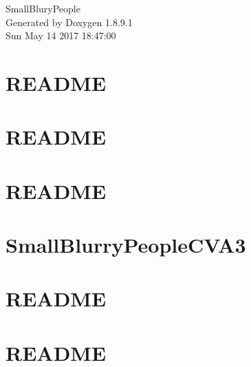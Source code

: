 \documentclass[twoside]{book}
\newcommand{\+}{\discretionary{\mbox{\scriptsize$\hookleftarrow$}}{}{}}
\newcommand{\clearemptydoublepage}{%
  \newpage{\pagestyle{empty}\cleardoublepage}%
}
\begin{document}
\hypersetup{pageanchor=false,
             bookmarks=true,
             bookmarksnumbered=true,
             pdfencoding=unicode
            }
\begin{titlepage}
\vspace*{7cm}
\begin{center}%
{\Large Small\+Blury\+People }\\
\vspace*{1cm}
{\large Generated by Doxygen 1.8.9.1}\\
\vspace*{0.5cm}
{\small Sun May 14 2017 18:47:00}\\
\end{center}
\end{titlepage}
\clearemptydoublepage
\tableofcontents
\clearemptydoublepage
{}
\hypersetup{pageanchor=true}

\chapter{R\+E\+A\+D\+M\+E}
\label{md_geo__r_e_a_d_m_e}
\hypertarget{md_geo__r_e_a_d_m_e}{}

\chapter{R\+E\+A\+D\+M\+E}
\label{md_include__r_e_a_d_m_e}
\hypertarget{md_include__r_e_a_d_m_e}{}

\chapter{R\+E\+A\+D\+M\+E}
\label{md_obj__r_e_a_d_m_e}
\hypertarget{md_obj__r_e_a_d_m_e}{}

\chapter{Small\+Blurry\+People\+C\+V\+A3}
\label{md__r_e_a_d_m_e}
\hypertarget{md__r_e_a_d_m_e}{}

\chapter{R\+E\+A\+D\+M\+E}
\label{md_shaders__r_e_a_d_m_e}
\hypertarget{md_shaders__r_e_a_d_m_e}{}

\chapter{R\+E\+A\+D\+M\+E}
\label{md_src__r_e_a_d_m_e}
\hypertarget{md_src__r_e_a_d_m_e}{}

\end{document}
